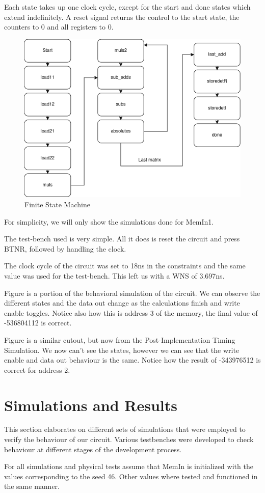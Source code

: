 \documentclass[12pt]{article}
\begin{document}
Each state takes up one clock cycle, except for the start and done states which extend indefinitely. A reset signal returns the control to the start state, the counters to 0 and all registers to 0.
\begin{figure}[H]
	\centering
	\includegraphics[width=0.55\linewidth]{images/FSM_lab3.png}
	\caption{Finite State Machine}
	\label{fig:fsm}
\end{figure}


For simplicity, we will only show the simulations done for MemIn1.

The test-bench used is very simple. All it does is reset the circuit and press BTNR, followed by handling the clock.

The clock cycle of the circuit was set to 18ns in the constraints and the same value was used for the test-bench. This left us with a WNS of 3.697ns.


Figure is a portion of the behavioral simulation of the circuit. We can observe the different states and the data out change as the calculations finish and write enable toggles. Notice also how this is address 3 of the memory, the final value of -536804112 is correct.


Figure is a similar cutout, but now from the Post-Implementation Timing Simulation. We now can't see the states, however we can see that the write enable and data out behaviour is the same. Notice how the result of -343976512 is correct for address 2.

\section{Simulations and Results}
This section elaborates on different sets of simulations that were employed to verify the behaviour of our circuit. Various testbenches were developed to check behaviour at different stages of the development process.

For all simulations and physical tests assume that MemIn is initialized with the values corresponding to the seed 46. Other values where tested and functioned in the same manner.
\end{document}
